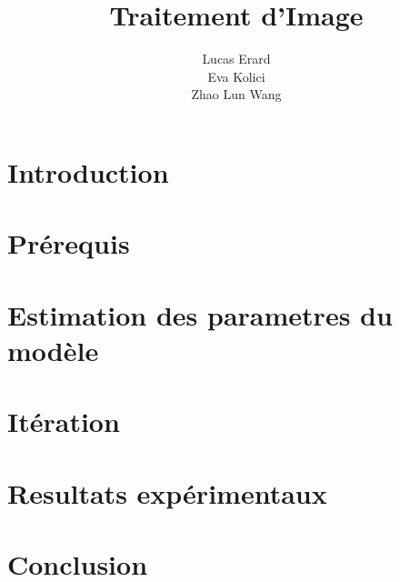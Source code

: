 \documentclass [a4paper,12pt] {article}
\title{Traitement d'Image}
\author{Lucas Erard \\ Eva Kolici \\ Zhao Lun Wang}
\begin{document}

\tableofcontents
\newpage
\section{Introduction}


\section{Prérequis}


\section{Estimation des parametres du modèle}


\section{Itération}


\section{Resultats expérimentaux}


\section{Conclusion}









\end{document}
